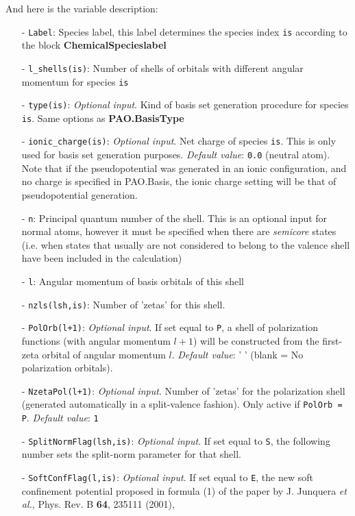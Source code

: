 \documentclass[11pt]{article}
\begin{document}
\begin{description}
\noindent
And here is the variable description:
\begin{itemize}
\item[-] {\tt Label}: Species label, this label determines
the species index {\tt is} according to the block {\bf ChemicalSpecieslabel}
\item[-] {\tt l\_shells(is)}: Number of shells of orbitals
with different angular momentum for species {\tt is}
\item[-] {\tt type(is)}: {\it Optional input}.
Kind of basis set generation procedure for species {\tt is}.
Same options as {\bf PAO.BasisType}
\item[-] {\tt ionic\_charge(is)}: {\it Optional input}.
Net charge of species {\tt is}. This is  only used for
basis set generation purposes. {\it Default value}: {\tt 0.0} (neutral
atom). Note that if the pseudopotential was generated in an ionic
configuration, and no charge is specified in PAO.Basis, the ionic
charge setting will be that of pseudopotential generation.
\item[-] {\tt n}: Principal quantum number of the shell. This is an optional
input for normal atoms, however it must be specified when there are
{\it semicore} states (i.e. when states that usually are not
considered to belong to the
valence shell have been included in the calculation)
\item[-] {\tt l}: Angular momentum of
basis orbitals of this shell
\item[-] {\tt nzls(lsh,is)}: Number of 'zetas' for this shell.
\item[-] {\tt PolOrb(l+1)}: {\it Optional input}. If set equal to {\tt P}, a
shell of
polarization functions (with angular momentum $l+1$)  will be constructed
from the first-zeta orbital of angular momentum $l$. {\it Default value}: ' '
(blank = No polarization orbitals).
\item[-] {\tt NzetaPol(l+1)}: {\it Optional input}. Number of
'zetas' for the
polarization shell (generated automatically in a split-valence fashion).
Only active if {\tt PolOrb = P}. {\it Default value}: {\tt 1}
\item[-] {\tt SplitNormFlag(lsh,is)}:
{\it Optional input}. If set equal to
{\tt S}, the following number sets the split-norm parameter for that shell.
\item[-] {\tt SoftConfFlag(l,is)}:
{\it Optional input}. If set equal to
{\tt E}, the new soft confinement potential proposed in formula (1) of
the paper by J. Junquera {\it et al.}, Phys. Rev. B {\bf 64}, 235111 (2001),

\end{itemize}
\end{description}
\end{document}
